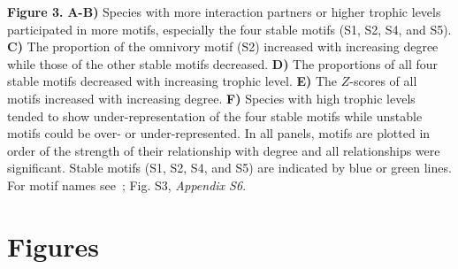 \documentclass[12pt]{article}
\begin{document}
\begin{spacing}{2.0}
	\noindent\textbf{Figure 3.} \textbf{A-B)} Species with more interaction partners or higher trophic levels participated in more motifs, especially the four stable motifs (S1, S2, S4, and S5). 
        \textbf{C)} The proportion of the omnivory motif (S2) increased with increasing degree while those of the other stable motifs decreased. \textbf{D)} The proportions of all four stable motifs  decreased with increasing trophic level.
		\textbf{E)} The $Z$-scores of all motifs increased with increasing degree.
        \textbf{F)} Species with high trophic levels tended to show under-representation of the four stable motifs while unstable motifs could be over- or under-represented. 
        In all panels, motifs are plotted in order of the strength of their relationship with degree and all relationships were significant. 
        Stable motifs (S1, S2, S4, and S5) are indicated by blue or green lines. 
        For motif names see~\citet{Stouffer2007}; Fig. S3, \emph{Appendix S6}.
\end{spacing}

\clearpage

\section*{Figures}
\end{document}
